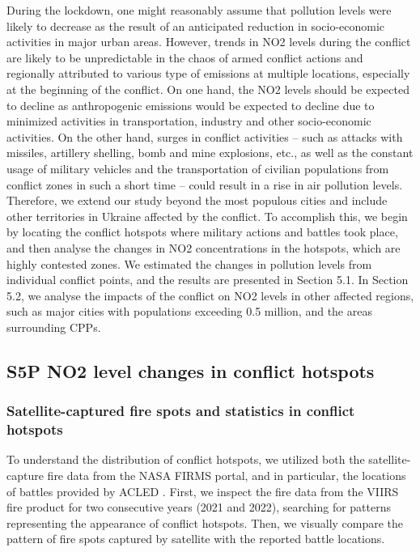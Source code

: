 During the lockdown, one might reasonably assume that pollution levels were likely to decrease as the result of an anticipated reduction in socio-economic activities in major urban areas. However, trends in NO2 levels during the conflict are likely to be unpredictable in the chaos of armed conflict actions and regionally attributed to various type of emissions at multiple locations, especially at the beginning of the conflict. On one hand, the NO2 levels should be expected to decline as anthropogenic emissions would be expected to decline due to minimized activities in transportation, industry and other socio-economic activities. On the other hand, surges in conflict activities – such as attacks with missiles, artillery shelling, bomb and mine explosions, etc., as well as the constant usage of military vehicles and the transportation of civilian populations from conflict zones in such a short time – could result in a rise in air pollution levels. Therefore, we extend our study beyond the most populous cities and include other territories in Ukraine affected by the conflict. To accomplish this, we begin by locating the conflict hotspots where military actions and battles took place, and then analyse the changes in NO2 concentrations in the hotspots, which are highly contested zones. We estimated the changes in pollution levels from individual conflict points, and the results are presented in Section 5.1. In Section 5.2, we analyse the impacts of the conflict on NO2 levels in other affected regions, such as major cities with populations exceeding 0.5 million, and the areas surrounding CPPs.\par
\subsection{S5P NO2 level changes in conflict hotspots}
\subsubsection*{Satellite-captured fire spots and statistics in conflict hotspots}
To understand the distribution of conflict hotspots, we utilized both the satellite-capture fire data from the NASA FIRMS portal, and in particular, the locations of battles provided by ACLED \citep{raleigh2010introducing}. First, we inspect the fire data from the VIIRS fire product for two consecutive years (2021 and 2022), searching for patterns representing the appearance of conflict hotspots. Then, we visually compare the pattern of fire spots captured by satellite with the reported battle locations.\par

